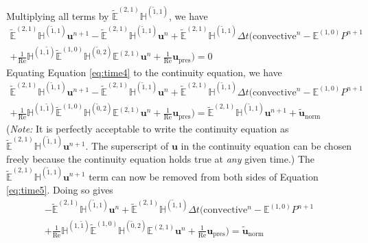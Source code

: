 Multiplying all terms by $\tilde{\mathbb{E}}^{(2,1)} \mathbb{H}^{(\tilde{1},1)}$, we have
\begin{multline}
    \label{eq:time4}
    \tilde{\mathbb{E}}^{(2,1)} \mathbb{H}^{(\tilde{1},1)} \mathbf{u}^{n+1} - \tilde{\mathbb{E}}^{(2,1)} \mathbb{H}^{(\tilde{1},1)} \mathbf{u}^{n} + \tilde{\mathbb{E}}^{(2,1)} \mathbb{H}^{(\tilde{1},1)} \Delta t \biggl( \text{convective}^{n} - \mathbb{E}^{(1,0)} P^{n+1} \\
    + \frac{1}{\text{Re}} \mathbb{H}^{(1,\tilde{1})} \tilde{\mathbb{E}}^{(1,0)} \mathbb{H}^{(\tilde{0},2)} \mathbb{E}^{(2,1)} \mathbf{u}^{n} + \frac{1}{\text{Re}} \mathbf{u}_{\text{pres}} \biggr) = 0
\end{multline}
Equating Equation \eqref{eq:time4} to the continuity equation, we have
\begin{multline}
    \label{eq:time5}
    \tilde{\mathbb{E}}^{(2,1)} \mathbb{H}^{(\tilde{1},1)} \mathbf{u}^{n+1} - \tilde{\mathbb{E}}^{(2,1)} \mathbb{H}^{(\tilde{1},1)} \mathbf{u}^{n} +  \tilde{\mathbb{E}}^{(2,1)} \mathbb{H}^{(\tilde{1},1)} \Delta t \biggl( \text{convective}^{n} - \mathbb{E}^{(1,0)} P^{n+1} \\
    + \frac{1}{\text{Re}} \mathbb{H}^{(1,\tilde{1})} \tilde{\mathbb{E}}^{(1,0)} \mathbb{H}^{(\tilde{0},2)} \mathbb{E}^{(2,1)} \mathbf{u}^{n} + \frac{1}{\text{Re}} \mathbf{u}_{\text{pres}} \biggr) = \tilde{\mathbb{E}}^{(2,1)} \mathbb{H}^{(\tilde{1},1)} \mathbf{u}^{n+1} + \mathbf{\tilde{u}}^{}_{\text{norm}}
\end{multline}
(\textit{Note:} It is perfectly acceptable to write the continuity equation as $\tilde{\mathbb{E}}^{(2,1)} \mathbb{H}^{(\tilde{1},1)} \mathbf{u}^{n+1}$. The superscript of $\mathbf{u}$ in the continuity equation can be chosen freely because the continuity equation holds true at \emph{any} given time.) The $\tilde{\mathbb{E}}^{(2,1)} \mathbb{H}^{(\tilde{1},1)} \mathbf{u}^{n+1}$ term can now be removed from both sides of Equation \eqref{eq:time5}. Doing so gives
\begin{multline}
    \label{eq:time6}
    - \tilde{\mathbb{E}}^{(2,1)} \mathbb{H}^{(\tilde{1},1)} \mathbf{u}^{n} +
    \tilde{\mathbb{E}}^{(2,1)} \mathbb{H}^{(\tilde{1},1)} \Delta t \biggl( \text{convective}^{n} - \mathbb{E}^{(1,0)} P^{n+1} \\
    + \frac{1}{\text{Re}} \mathbb{H}^{(1,\tilde{1})} \tilde{\mathbb{E}}^{(1,0)} \mathbb{H}^{(\tilde{0},2)} \mathbb{E}^{(2,1)} \mathbf{u}^{n} + \frac{1}{\text{Re}} \mathbf{u}_{\text{pres}} \biggr) = \mathbf{\tilde{u}}^{}_{\text{norm}}
\end{multline}

